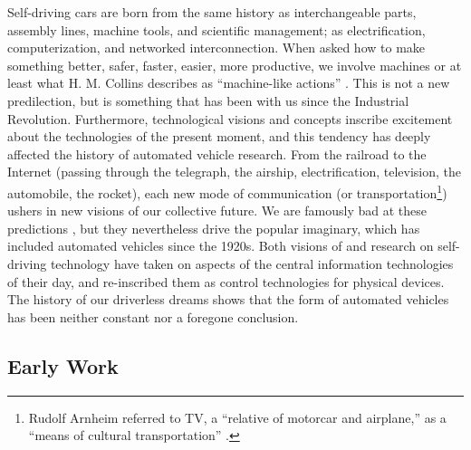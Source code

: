
Self-driving cars are born from the
same history as interchangeable parts, assembly lines, machine tools,
and scientific management; as electrification, computerization, and
networked interconnection. When asked how to make something better,
safer, faster, easier, more productive, we involve machines or at
least what H. M. Collins describes as ``machine-like actions''
\cite[p. 42]{Collins}. This is not a new predilection, but is
something that has been with us since the Industrial Revolution.
Furthermore, technological visions and concepts inscribe excitement about the
technologies of the present moment, and this tendency has deeply
affected the history of automated vehicle research. From the railroad to the
Internet (passing through the telegraph, the airship, electrification,
television, the automobile, the rocket), each new mode of
communication (or transportation\footnote{Rudolf Arnheim referred to
  TV, a ``relative of motorcar and airplane,'' as a ``means of
  cultural transportation'' \cite[p. 194]{arnheim}.}) ushers in new visions of our
collective future. We are famously bad at these predictions \cite{vanriper}, but they
nevertheless drive the popular imaginary, which has included automated
vehicles since the 1920s. Both visions of and research on self-driving
technology have taken on aspects of the central information
technologies of their day, and re-inscribed them as control
technologies for physical devices. The history of our driverless
dreams shows that the form of automated vehicles has been neither
constant nor a foregone conclusion.

\subsection{Early Work}

